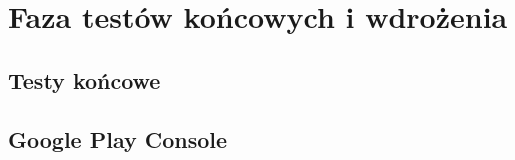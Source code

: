 \section{Faza testów końcowych i wdrożenia}

\subsection{Testy końcowe}

\subsection{Google Play Console}